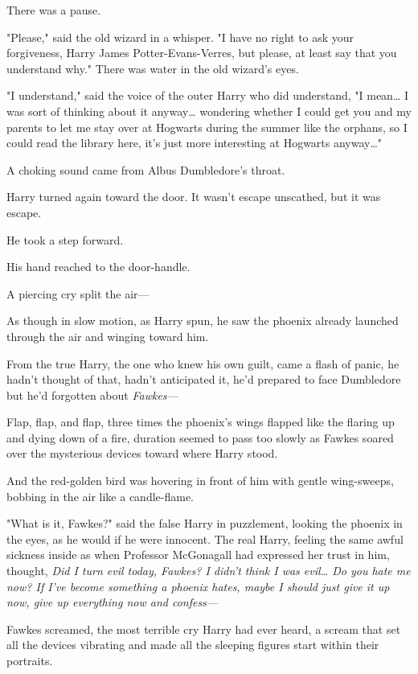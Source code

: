 There was a pause.

"Please," said the old wizard in a whisper. "I have no right to ask your
forgiveness, Harry James Potter-Evans-Verres, but please, at least say that you
understand why." There was water in the old wizard's eyes.

"I understand," said the voice of the outer Harry who did understand, "I
mean{\ldots} I was sort of thinking about it anyway{\ldots} wondering whether I
could get you and my parents to let me stay over at Hogwarts during the summer
like the orphans, so I could read the library here, it's just more interesting
at Hogwarts anyway{\ldots}"

A choking sound came from Albus Dumbledore's throat.

Harry turned again toward the door. It wasn't escape unscathed, but it was
escape.

He took a step forward.

His hand reached to the door-handle.

A piercing cry split the air---

As though in slow motion, as Harry spun, he saw the phoenix already launched
through the air and winging toward him.

From the true Harry, the one who knew his own guilt, came a flash of panic, he
hadn't thought of that, hadn't anticipated it, he'd prepared to face Dumbledore
but he'd forgotten about \emph{Fawkes---}

Flap, flap, and flap, three times the phoenix's wings flapped like the flaring
up and dying down of a fire, duration seemed to pass too slowly as Fawkes
soared over the mysterious devices toward where Harry stood.

And the red-golden bird was hovering in front of him with gentle wing-sweeps,
bobbing in the air like a candle-flame.

"What is it, Fawkes?" said the false Harry in puzzlement, looking the phoenix
in the eyes, as he would if he were innocent. The real Harry, feeling the same
awful sickness inside as when Professor McGonagall had expressed her trust in
him, thought, \emph{Did I turn evil today, Fawkes? I didn't think I was
evil{\ldots} Do you hate me now? If I've become something a phoenix hates,
maybe I should just give it up now, give up everything now and confess---}

Fawkes screamed, the most terrible cry Harry had ever heard, a scream that set
all the devices vibrating and made all the sleeping figures start within their
portraits.

